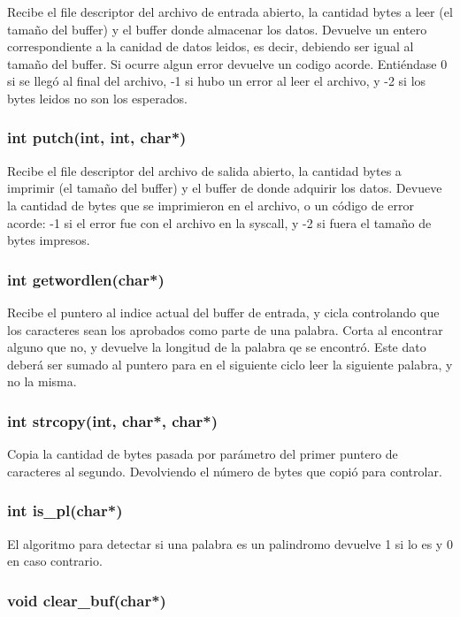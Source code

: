 \documentclass[10pt,a4paper]{article}
\begin{document}
Recibe el file descriptor del archivo de entrada abierto, la cantidad bytes a leer (el tamaño del buffer) y el buffer donde almacenar los datos. Devuelve un entero correspondiente a la canidad de datos leidos, es decir, debiendo ser igual al tamaño del buffer. Si ocurre algun error devuelve un codigo acorde. Entiéndase 0 si se llegó al final del archivo, -1 si hubo un error al leer el archivo, y -2 si los bytes leidos no son los esperados.

\subsubsection{int putch(int, int, char*)}

Recibe el file descriptor del archivo de salida abierto, la cantidad bytes a imprimir (el tamaño del buffer) y el buffer de donde adquirir los datos. Devueve la cantidad de bytes que se imprimieron en el archivo, o un código de error acorde: -1 si el error fue con el archivo en la syscall, y -2 si fuera el tamaño de bytes impresos.


\subsubsection{int getwordlen(char*)}

Recibe el puntero al indice actual del buffer de entrada, y cicla controlando que los caracteres sean los aprobados como parte de una palabra. Corta al encontrar alguno que no, y devuelve la longitud de la palabra qe se encontró. Este dato deberá ser sumado al puntero para en el siguiente ciclo leer la siguiente palabra, y no la misma.


\subsubsection{int strcopy(int, char*, char*)}

Copia la cantidad de bytes pasada por parámetro del primer puntero de caracteres al segundo. Devolviendo el número de bytes que copió para controlar.


\subsubsection{int is_pl(char*)}

El algoritmo para detectar si una palabra es un palindromo devuelve 1 si lo es y 0 en caso contrario.


\subsubsection{void clear_buf(char*)}
\end{document}
